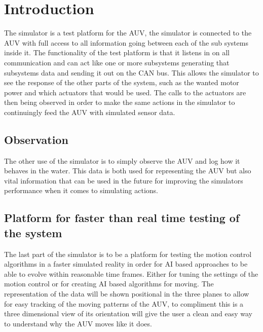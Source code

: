 \section{Introduction}\label{sec:introduction}
The simulator is a test platform for the AUV, the simulator is connected to the AUV with full access to all information going between each of the sub systems inside it. The functionality of the test platform is that it listens in on all communication and can act like one or more subsystems generating that subsystems data and sending it out on the CAN bus. This allows the simulator to see the response of the other parts of the system, such as the wanted motor power and which actuators that would be used. The calls to the actuators are then being observed in order to make the same actions in the simulator to continuingly feed the AUV with simulated sensor data.

\subsection{Observation}
The other use of the simulator is to simply observe the AUV and log how it behaves in the water. This data is both used for representing the AUV but also vital information that can be used in the future for improving the simulators performance when it comes to simulating actions.
\subsection{Platform for faster than real time testing of the system}
The last part of the simulator is to be a platform for testing the motion control algorithms in a faster simulated reality in order for AI based approaches to be able to evolve within reasonable time frames. Either for tuning the settings of the motion control or for creating AI based algorithms for moving.
\linebreak
The representation of the data will be shown positional in the three planes to allow for easy tracking of the moving patterns of the AUV, to compliment this is a three dimensional view of its orientation will give the user a clean and easy way to understand why the AUV moves like it does.
